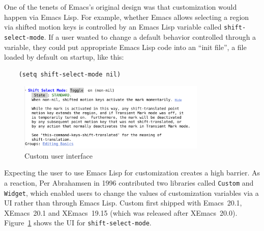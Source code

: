 \documentclass[format=acmsmall,screen]{acmart}
\newcommand \Elisp {Emacs Lisp}
\begin{document}
One of the tenets of Emacs's original design was that customization
would happen via \Elisp.  For example, whether Emacs allows selecting
a region via shifted motion keys is controlled by an \Elisp{} variable
called \texttt{shift-select-mode}.  If a user wanted to change a default
behavior controlled through a variable, they could put appropriate
\Elisp{} code into an ``init file'', a file loaded by default on
startup, like this:
%
\begin{verbatim}
    (setq shift-select-mode nil)
\end{verbatim}
%
\begin{figure}[tb]
  \centering
  \includegraphics[width=0.8\textwidth]{custom}  
  \caption{Custom user interface}
  \label{fig:custom}
\end{figure}
%
Expecting the user to use \Elisp{} for customization creates a high
barrier.  As a reaction, Per Abrahamsen in 1996 contributed two
libraries called \texttt{Custom} and \texttt{Widget}, which enabled
users to change the values of customization variables via a UI
rather than through \Elisp{}.  Custom first shipped with Emacs~20.1,
XEmacs~20.1 and XEmacs~19.15 (which was released after XEmacs~20.0).
Figure~\ref{fig:custom} shows the UI
for \texttt{shift-select-mode}.
\end{document}
